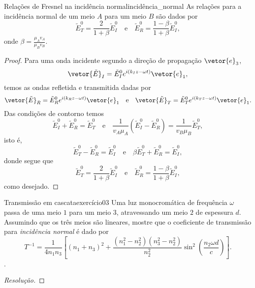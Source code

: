 \begin{lemma}{Relações de Fresnel na incidência normal}{incidência_normal}
    As relações para a incidência normal de um meio \(A\) para um meio \(B\) são dados por
    \begin{equation*}
        \tilde{E}^0_T = \frac{2}{1 + \beta} \tilde{E}^0_I \quad\text{e}\quad
        \tilde{E}^0_R = \frac{1 - \beta}{1 + \beta}\tilde{E}^0_I,
    \end{equation*}
    onde \(\beta = \frac{\mu_A v_A}{\mu_B v_B}\).
\end{lemma}
\begin{proof}
    Para uma onda incidente segundo a direção de propagação \(\vetor{e}_3\),
    \begin{equation*}
        \vetor{\tilde{E}}_I = \tilde{E}^0_I e^{i(k_Iz - \omega t)} \vetor{e}_1,
    \end{equation*}
    temos as ondas refletida e transmitida dadas por
    \begin{equation*}
        \vetor{\tilde{E}}_R = \tilde{E}^0_R e^{i(k_Rz - \omega t)} \vetor{e}_1\quad\text{e}\quad
        \vetor{\tilde{E}}_T = \tilde{E}^0_T e^{i(k_Tz - \omega t)} \vetor{e}_1.
    \end{equation*}
    Das condições de contorno temos
    \begin{equation*}
        \tilde{E}^0_I + \tilde{E}^0_R = \tilde{E}^0_T\quad\text{e}\quad\frac{1}{v_A\mu_A} (\tilde{E}^0_I - \tilde{E}^0_R) = \frac{1}{v_B\mu_B} \tilde{E}^0_T,
    \end{equation*}
    isto é,
    \begin{equation*}
        \tilde{E}^0_T - \tilde{E}^0_R = \tilde{E}^0_I\quad\text{e}\quad \beta \tilde{E}^0_T + \tilde{E}^0_R = \tilde{E}^0_I,
    \end{equation*}
    donde segue que
    \begin{equation*}
        \tilde{E}^0_T = \frac{2}{1 + \beta} \tilde{E}^0_I\quad\text{e}\quad \tilde{E}^0_R = \frac{1 - \beta}{1 + \beta} \tilde{E}^0_I,
    \end{equation*}
    como desejado.
\end{proof}
\begin{exercício}{Transmissão em cascata}{exercício03}
    Uma luz monocromática de frequência \(\omega\) passa de uma meio \(1\) para um meio \(3\), atravessando um meio \(2\) de espessura \(d\). Assumindo que os três meios são lineares, mostre que o coeficiente de transmissão para \emph{incidência normal} é dado por
    \begin{equation*}
        T^{-1} = \frac{1}{4n_1n_3} \left[(n_1 + n_3)^2 + \frac{(n_1^2 - n_2^2)(n_3^2 - n_2^2)}{n_2^2}\sin^2\left(\frac{n_2\omega d}{c}\right)\right].
    \end{equation*}
    .
\end{exercício}
\begin{proof}[Resolução]
\end{proof}
